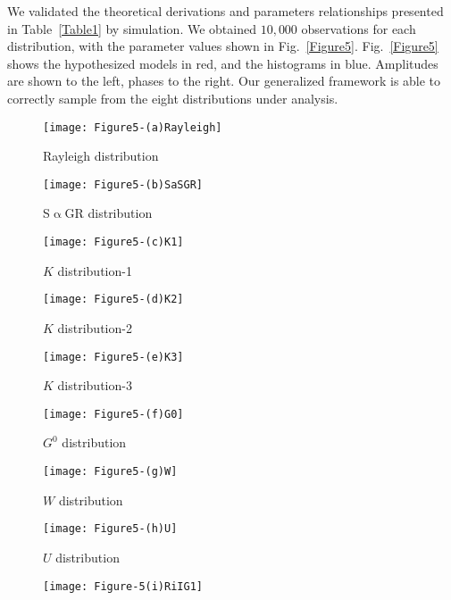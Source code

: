 \documentclass[journal]{IEEEtran}
\begin{document}
We validated the theoretical derivations and parameters relationships presented in Table~\ref{Table1} by simulation.
We obtained $10,000$ observations for each distribution, with the parameter values shown in Fig.~\ref{Figure5}.
Fig.~\ref{Figure5} shows
the hypothesized models in red, and
the histograms in blue.
Amplitudes are shown to the left, phases to the right.
Our generalized framework is able to correctly sample from the eight distributions under analysis.

\begin{figure*}[htb]
\centering
\begin{subfigure}[t]{4.2cm}
	\centering
	\texttt{[image: Figure5-(a)Rayleigh]}
	\caption{Rayleigh distribution}\label{Figure5(a)}
\end{subfigure}
\begin{subfigure}[t]{4.2cm}
	\centering
	\texttt{[image: Figure5-(b)SaSGR]}
	\caption{S$\upalpha$GR distribution}\label{Figure5(b)}
\end{subfigure}
\begin{subfigure}[t]{4.2cm}
	\centering
	\texttt{[image: Figure5-(c)K1]}
	\caption{$K$ distribution-1}\label{Figure5(c)}
\end{subfigure}
\begin{subfigure}[t]{4.2cm}
	\centering
	\texttt{[image: Figure5-(d)K2]}
	\caption{$K$ distribution-2}\label{Figure5(d)}
\end{subfigure}
\begin{subfigure}[t]{4.2cm}
	\centering
	\texttt{[image: Figure5-(e)K3]}
	\caption{$K$ distribution-3}\label{Figure5(e)}
\end{subfigure}
\begin{subfigure}[t]{4.2cm}
	\centering
	\texttt{[image: Figure5-(f)G0]}
	\caption{$G^0$ distribution}\label{Figure5(f)}
\end{subfigure}
\begin{subfigure}[t]{4.2cm}
	\centering
	\texttt{[image: Figure5-(g)W]}
	\caption{$W$ distribution}\label{Figure5(g)}
\end{subfigure}
\begin{subfigure}[t]{4.2cm}
	\centering
	\texttt{[image: Figure5-(h)U]}
	\caption{$U$ distribution}\label{Figure5(h)}
\end{subfigure}
\begin{subfigure}[t]{4.2cm}
	\centering
	\texttt{[image: Figure-5(i)RiIG1]}

\end{subfigure}
\end{figure*}
\end{document}
